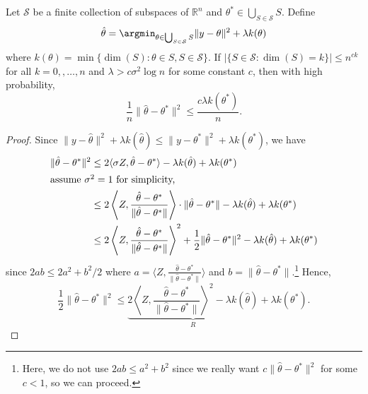 \begin{theorem}\label{thm:union-of-subspace}
	Let \(\mathcal{S} \) be a finite collection of subspaces of \(\mathbb{R} ^n\) and \(\theta ^{\ast} \in \bigcup_{S \in \mathcal{S} } S \). Define
	\[
		\hat{\theta} = \argmin_{\theta \in \bigcup_{S \in \mathcal{S} } S } \lVert y - \theta  \rVert  ^2 + \lambda k(\theta )
	\]
	where \(k(\theta ) = \min \{ \dim (S) \colon \theta \in S, S\in \mathcal{S}  \} \). If \(\vert \{ S \in \mathcal{S} \colon \dim (S) = k \} \vert \leq n^{ck}\) for all \(k = 0, , \dots , n\) and \(\lambda > c \sigma ^2 \log n\) for some constant \(c\), then with high probability,
	\[
		\frac{1}{n} \lVert \hat{\theta} - \theta ^{\ast}  \rVert ^2 \leq \frac{c \lambda k(\theta ^{\ast} )}{n}.
	\]
\end{theorem}
\begin{proof}
	Since \(\lVert y - \hat{\theta} \rVert ^2 + \lambda k(\hat{\theta} ) \leq \lVert y - \theta ^{\ast} \rVert ^2 + \lambda k(\theta ^{\ast} )\), we have
	\begin{align*}
		\lVert \hat{\theta} - \theta ^{\ast}  \rVert ^2
		 & \leq 2 \langle \sigma Z, \hat{\theta} - \theta ^{\ast}  \rangle - \lambda k(\hat{\theta} ) + \lambda k(\theta ^{\ast} )                                                                                                                           \\
		\shortintertext{assume \(\sigma ^2 = 1\) for simplicity,}
		 & \leq 2 \left\langle Z, \frac{\hat{\theta} - \theta ^{\ast} }{\lVert \hat{\theta} - \theta ^{\ast}  \rVert } \right\rangle \cdot \lVert \hat{\theta} - \theta ^{\ast}  \rVert - \lambda k(\hat{\theta} ) + \lambda k(\theta ^{\ast} )              \\
		 & \leq 2 \left\langle Z, \frac{\hat{\theta} - \theta ^{\ast} }{\lVert \hat{\theta} - \theta ^{\ast} \rVert } \right\rangle ^2 + \frac{1}{2} \lVert \hat{\theta} - \theta ^{\ast}  \rVert ^2 - \lambda k(\hat{\theta} ) + \lambda k(\theta ^{\ast} )
	\end{align*}
	since \(2ab \leq 2 a^2 + b^2 / 2\) where \(a = \langle Z, \frac{\hat{\theta} - \theta ^{\ast}}{\lVert \hat{\theta} - \theta ^{\ast} \rVert } \rangle \) and \(b = \lVert \hat{\theta} - \theta ^{\ast} \rVert \).\footnote{Here, we do not use \(2ab \leq a^2 + b^2\) since we really want \(c \lVert \hat{\theta} - \theta ^{\ast} \rVert ^2\) for some \(c < 1\), so we can proceed.} Hence,
	\[
		\frac{1}{2} \lVert \hat{\theta} - \theta ^{\ast}  \rVert ^2
		\leq \underbrace{2 \left\langle Z, \frac{\hat{\theta} - \theta ^{\ast}}{\lVert \hat{\theta} - \theta ^{\ast} \rVert } \right\rangle ^2 - \lambda k(\hat{\theta} )}_{R} + \lambda k(\theta ^{\ast} ).
\]
\end{proof}
